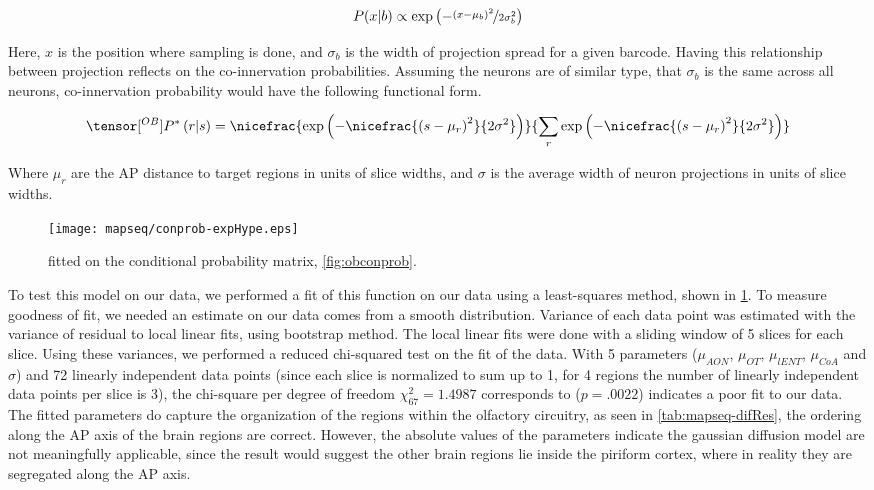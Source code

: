 \documentclass[../dissertation.tex]{subfiles}
\begin{document}
\begin{align}
    P(x|b) \propto \exp \left( - \nicefrac{\left(x - \mu_b\right)^2}{2 \sigma_b^2 } \right)
\end{align}

Here, $x$ is the position where sampling is done, and $\sigma_b$ is the width of projection spread for a given barcode.
Having this relationship between projection reflects on the co-innervation probabilities.
Assuming the neurons are of similar type, that $\sigma_b$ is the same across all neurons, co-innervation probability would have the following functional form.

\begin{align}
    \label{eqn:coinv-hyp}
    \tensor[^{OB}]{P}{^*} \left( r | s \right) = \nicefrac{
        \exp \left( - \nicefrac{ \left( s - \mu_r \right)^ 2}{ 2 \sigma^2 } \right)
    }{  \sum_r
        \exp \left( - \nicefrac{ \left( s - \mu_r \right)^2 }{ 2 \sigma^2 } \right)
    }
\end{align}

Where $\mu_r$ are the AP distance to target regions in units of slice widths, and $\sigma$ is the average width of neuron projections in units of slice widths.

\begin{figure}[ht!]
    \centering
    \texttt{[image: mapseq/conprob-expHype.eps]}
    \caption{ fitted on the conditional probability matrix, \cref{fig:obconprob}.}
    \label{fig:coinv-hyp}
\end{figure}

To test this model on our data, we performed a fit of this function on our data using a least-squares method, shown in \cref{fig:coinv-hyp}.
To measure goodness of fit, we needed an estimate on our data comes from a smooth distribution.
Variance of each data point was estimated with the variance of residual to local linear fits, using bootstrap method.
The local linear fits were done with a sliding window of 5 slices for each slice.
Using these variances, we performed a reduced chi-squared test on the fit of the data.
With 5 parameters ($\mu_{AON}$, $\mu_{OT}$, $\mu_{lENT}$, $\mu_{CoA}$ and $\sigma$) and 72 linearly independent data points (since each slice is normalized to sum up to 1, for 4 regions the number of linearly independent data points per slice is 3),
the chi-square per degree of freedom $\chi^2_{67} = 1.4987$ corresponds to ($p = .0022$) indicates a poor fit to our data.
The fitted parameters do capture the organization of the regions within the olfactory circuitry, as seen in \cref{tab:mapseq-difRes}, the ordering along the AP axis of the brain regions are correct.
However, the absolute values of the parameters indicate the gaussian diffusion model are not meaningfully applicable, since the result would suggest the other brain regions lie inside the piriform cortex, where in reality they are segregated along the AP axis.
\end{document}
